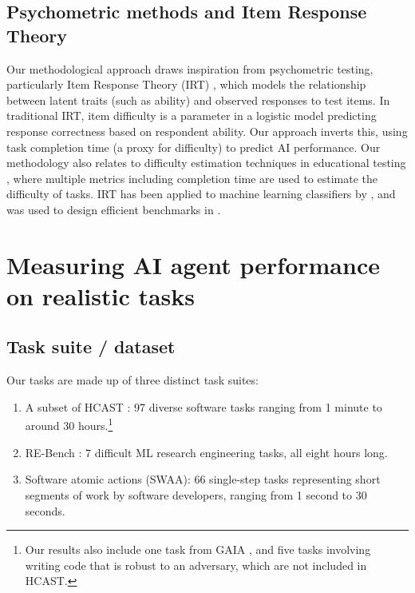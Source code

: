 \documentclass{article}
\newcommand{\gabenchmark}{HCAST}
\begin{document}
\subsection{Psychometric methods and Item Response Theory}
Our methodological approach draws inspiration from psychometric testing, particularly Item Response Theory (IRT) \citep{baker2001basics}, which models the relationship between latent traits (such as ability) and observed responses to test items. In traditional IRT, item difficulty is a parameter in a logistic model predicting response correctness based on respondent ability. Our approach inverts this, using task completion time (a proxy for difficulty) to predict AI performance.
Our methodology also relates to difficulty estimation techniques in educational testing \citep{de2017handbook}, where multiple metrics including completion time are used to estimate the difficulty of tasks. IRT has been applied to machine learning classifiers by \citet{martinezplumed201918item}, and was used to design efficient benchmarks in \citet{song2021efficient}. 

\section{Measuring AI agent performance on realistic tasks} \label{methodology}



\subsection{Task suite / dataset}\label{sec:tasks}

Our tasks are made up of three distinct task suites:

\begin{enumerate}

\item {A subset of \gabenchmark{} \cite{METR_HCAST}}: 97 diverse software tasks ranging from 1 minute to around 30 hours.\footnote{Our results also include one task from GAIA \citep{mialon2024gaia}, and five tasks involving writing code that is robust to an adversary, which are not included in \gabenchmark{}.}
\item RE-Bench \cite{wijk2024re}: 7 difficult ML research engineering tasks, all eight hours long.
\item Software atomic actions (SWAA): 66 single-step tasks representing short segments of work by software developers, ranging from 1 second to 30 seconds.
\end{enumerate}
\end{document}
